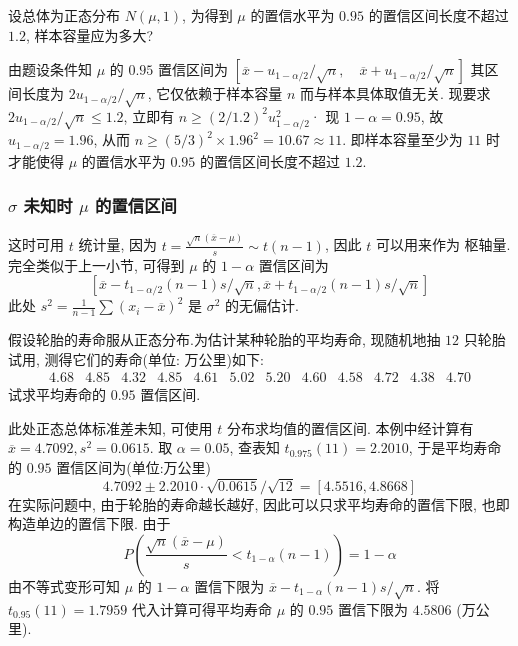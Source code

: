 \begin{example}\label{exam:6.5.4}
设总体为正态分布 $N(\mu,1)$, 为得到 $\mu$ 的置信水平为 $0.95$ 的置信区间长度不超过 $1.2$, 样本容量应为多大?
\end{example}\begin{solution}
由题设条件知 $\mu$ 的 $0.95$ 置信区间为
$\left[\overline{x}-u_{1-\alpha/ 2} / \sqrt{n}, \quad \overline{x}+u_{1-\alpha / 2} / \sqrt{n}\right]$
其区间长度为 $2 u_{1-{\alpha/ 2}}/\sqrt{n}$, 它仅依赖于样本容量 $n$ 而与样本具体取值无关. 现要求 $2 u_{1-\alpha / 2} / \sqrt{n} \leqslant 1.2$, 立即有 $n \geqslant(2 / 1.2)^{2} u_{1-\alpha/2}^{2}$· 现 $1-\alpha=0.95$, 故 $u_{1-\alpha / 2}=1.96$, 从而 $n \geqslant(5 / 3)^{2} \times 1.96^{2}=10.67 \approx 11$. 即样本容量至少为 $11$ 时才能使得 $\mu$ 的置信水平为 $0.95$ 的置信区间长度不超过 $1.2$.
\end{solution}

\subsubsection{$\sigma$ 未知时 $\mu$ 的置信区间}\label{sssec:6.5.3.2}

这时可用 $t$ 统计量, 因为 $t=\frac{\sqrt{n}(\overline{x}-\mu)}{s} \sim t(n-1)$, 因此 $t$ 可以用来作为 枢轴量.完全类似于上一小节, 可得到 $\mu$ 的 $1-\alpha$ 置信区间为
\begin{equation}\label{eq:6.5.9}
\left[\overline{x}-t_{1-\alpha/ 2}(n-1) s / \sqrt{n}, \overline{x}+t_{1-\alpha/ 2}(n-1) s / \sqrt{n}\right]
\end{equation}
此处 $s^{2}=\frac{1}{n-1} \sum\left(x_{i}-\overline{x}\right)^{2}$ 是 $\sigma^2$ 的无偏估计.

\begin{example}\label{exam:6.5.5}
假设轮胎的寿命服从正态分布.为估计某种轮胎的平均寿命, 现随机地抽 $12$ 只轮胎试用, 测得它们的寿命(单位: 万公里)如下:
\[\begin{array}{cccccccccccc}
4.68 & 4.85 & 4.32 & 4.85 & 4.61 &5.02 & 5.20 & 4.60 & 4.58 & 4.72 & 4.38 & 4.70
\end{array}\]
试求平均寿命的 $0.95$ 置信区间.
\end{example}\begin{solution}
此处正态总体标准差未知, 可使用 $t$ 分布求均值的置信区间. 本例中经计算有 $\overline{x}=4.7092, s^{2}=0.0615$. 取 $\alpha=0.05$, 查表知 $t_{0.975}(11)=2.2010$, 于是平均寿命的 $0.95$ 置信区间为(单位:万公里)
\[4.7092 \pm 2.2010 \cdot \sqrt{0.0615} / \sqrt{12}=[4.5516,4.8668]\]
在实际问题中, 由于轮胎的寿命越长越好, 因此可以只求平均寿命的置信下限, 也即构造单边的置信下限. 由于
\[P\left(\frac{\sqrt{n}(\overline{x}-\mu)}{s}<t_{1-\alpha}(n-1)\right)=1-\alpha\]
由不等式变形可知 $\mu$ 的 $1-\alpha$ 置信下限为 $\overline{x}-t_{1-\alpha}(n-1) s / \sqrt{n}$. 将 $t_{0.95}(11)=1.7959$ 代入计算可得平均寿命 $\mu$ 的 $0.95$ 置信下限为 $4.5806$ (万公里).
\end{solution}

